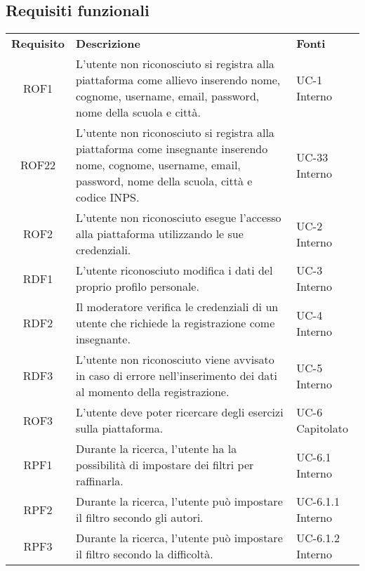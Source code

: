 \subsection{Requisiti funzionali}
\begin{tabularx}{\textwidth}{| c | p{10cm} | X |}
		\rowcolor{LightBlue}
		\color{white}\bfseries Requisito & \color{white}\bfseries Descrizione & \color{white}\bfseries Fonti\\[0.25cm]
		ROF1 & L'utente non riconosciuto si registra alla piattaforma come allievo inserendo nome, cognome, username, email, password, nome della scuola e città. & UC-1 \newline Interno\\
		ROF22 & L'utente non riconosciuto si registra alla piattaforma come insegnante inserendo nome, cognome, username, email, password, nome della scuola, città e codice INPS. & UC-33 \newline Interno\\	
		ROF2 & L'utente non riconosciuto esegue l'accesso alla piattaforma utilizzando le sue credenziali. & UC-2 \newline Interno\\
		RDF1 & L'utente riconosciuto modifica i dati del proprio profilo personale. & UC-3 \newline Interno\\
		RDF2 & Il moderatore verifica le credenziali di un utente che richiede la registrazione come insegnante. & UC-4 \newline Interno\\
		RDF3 & L'utente non riconosciuto viene avvisato in caso di errore nell'inserimento dei dati al momento della registrazione. & UC-5 \newline Interno\\
		ROF3 & L'utente deve poter ricercare degli esercizi sulla piattaforma. & UC-6 \newline Capitolato\\
		RPF1 & Durante la ricerca, l'utente ha la possibilità di impostare dei filtri per raffinarla. & UC-6.1 \newline Interno\\
		RPF2 & Durante la ricerca, l'utente può impostare il filtro secondo gli autori. & UC-6.1.1 \newline Interno\\
		RPF3 & Durante la ricerca, l'utente può impostare il filtro secondo la difficoltà. & UC-6.1.2 \newline Interno\\

\end{tabularx}
